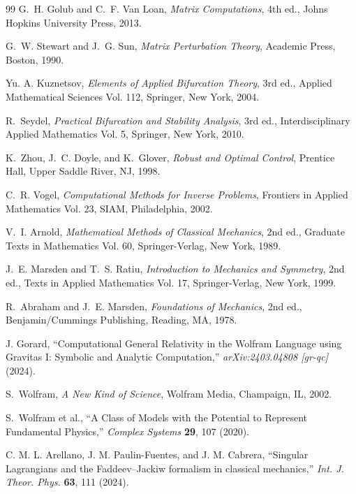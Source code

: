 \documentclass[11pt,a4paper]{article}
\begin{document}
\begin{thebibliography}{99}
	G.~H. Golub and C.~F. Van Loan, \textit{Matrix Computations}, 4th ed., Johns Hopkins University Press, 2013.
	
	G.~W. Stewart and J.~G. Sun, \textit{Matrix Perturbation Theory}, Academic Press, Boston, 1990.
	
	Yu. A. Kuznetsov, \textit{Elements of Applied Bifurcation Theory}, 3rd ed., Applied Mathematical Sciences Vol. 112, Springer, New York, 2004.
	
	R.~Seydel, \textit{Practical Bifurcation and Stability Analysis}, 3rd ed., Interdisciplinary Applied Mathematics Vol. 5, Springer, New York, 2010.
	
	K.~Zhou, J.~C. Doyle, and K.~Glover, \textit{Robust and Optimal Control}, Prentice Hall, Upper Saddle River, NJ, 1998.
	
	C.~R. Vogel, \textit{Computational Methods for Inverse Problems}, Frontiers in Applied Mathematics Vol. 23, SIAM, Philadelphia, 2002.
	
	V.~I. Arnold, \textit{Mathematical Methods of Classical Mechanics}, 2nd ed., Graduate Texts in Mathematics Vol. 60, Springer-Verlag, New York, 1989.
	
	J.~E. Marsden and T.~S. Ratiu, \textit{Introduction to Mechanics and Symmetry}, 2nd ed., Texts in Applied Mathematics Vol. 17, Springer-Verlag, New York, 1999.
	
	R.~Abraham and J.~E. Marsden, \textit{Foundations of Mechanics}, 2nd ed., Benjamin/Cummings Publishing, Reading, MA, 1978.
	
	J. Gorard, ``Computational General Relativity in the Wolfram Language using Gravitas I: Symbolic and Analytic Computation,'' \textit{arXiv:2403.04808 [gr-qc]} (2024).
	
	S.~Wolfram, \textit{A New Kind of Science}, Wolfram Media, Champaign, IL, 2002.
	
	S.~Wolfram et al., ``A Class of Models with the Potential to Represent Fundamental Physics,'' \textit{Complex Systems} \textbf{29}, 107 (2020).
	
	C. M. L. Arellano, J. M. Paulin-Fuentes, and J. M. Cabrera, ``Singular Lagrangians and the Faddeev--Jackiw formalism in classical mechanics,'' \textit{Int. J. Theor. Phys.} \textbf{63}, 111 (2024).
	

\end{thebibliography}
\end{document}
